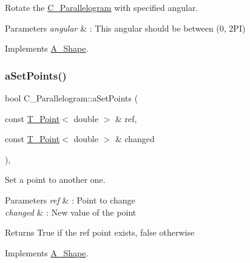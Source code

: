 Rotate the \hyperlink{classC__Parallelogram}{C\+\_\+\+Parallelogram} with specified angular. 


\begin{DoxyParams}{Parameters}
{\em angular} & \+: This angular should be between (0, 2\+PI) \\
\hline
\end{DoxyParams}


Implements \hyperlink{classA__Shape_a25b4e0c34cdb46da5382fe9c7467efaf}{A\+\_\+\+Shape}.

\mbox{\label{classC__Parallelogram_adfe1c40f2d33955617e3a535c548dfa0}} 
\subsubsection{\texorpdfstring{a\+Set\+Points()}{aSetPoints()}\hspace{0.1cm}{\footnotesize\ttfamily [1/2]}}
{\footnotesize\ttfamily bool C\+\_\+\+Parallelogram\+::a\+Set\+Points (\begin{DoxyParamCaption}\item[{const \hyperlink{classT__Point}{T\+\_\+\+Point}$<$ double $>$ \&}]{ref,  }\item[{const \hyperlink{classT__Point}{T\+\_\+\+Point}$<$ double $>$ \&}]{changed }\end{DoxyParamCaption})\hspace{0.3cm}{\ttfamily [override]}, {\ttfamily [virtual]}}



Set a point to another one. 


\begin{DoxyParams}{Parameters}
{\em ref} & \+: Point to change \\
\hline
{\em changed} & \+: New value of the point \\
\hline
\end{DoxyParams}
\begin{DoxyReturn}{Returns}
True if the ref point exists, false otherwise 
\end{DoxyReturn}


Implements \hyperlink{classA__Shape_a6996f454b337f8425ad13cba3f7a7c35}{A\+\_\+\+Shape}.

\mbox{\label{classC__Parallelogram_adfe1c40f2d33955617e3a535c548dfa0}} 
